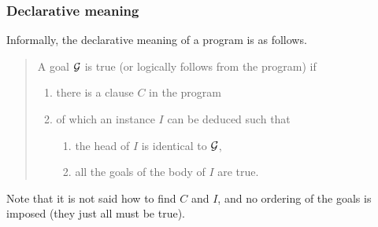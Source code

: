 



%
\begin{frame}
\frametitle{Declarative meaning}

Informally, the declarative meaning of a \Prolog program is as
follows.

{\it
\begin{quote}
A goal \(\cal G\) is true (or logically follows from the program) if
\begin{enumerate}

  \item there is a clause \(C\) in the program

  \item of which an instance \(I\) can be deduced such that
    \begin{enumerate}

      \item the head of \(I\) is identical to \(\cal G\),

      \item all the goals of the body of \(I\) are true.

    \end{enumerate}

\end{enumerate}

\end{quote}
}
Note that it is not said how to find \(C\) and \(I\), and no ordering
of the goals is imposed (they just all must be true).

\end{frame}

